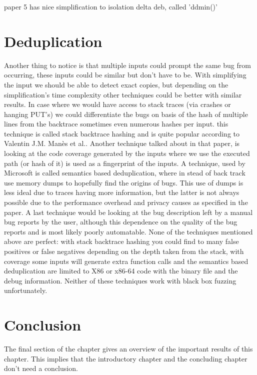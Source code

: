  paper 5 has nice simplification to isolation delta deb, called 'ddmin()'

\section{Deduplication}
Another thing to notice is that multiple inputs could prompt the same bug from occurring, these inputs could be similar but don't have to be. With simplifying the input we should be able to detect exact copies, but depending on the simplification's time complexity other techniques could be better with similar results. In case where we would have access to stack traces (via crashes or hanging PUT's) we could differentiate the bugs on basis of the hash of multiple lines from the backtrace sometimes even numerous hashes per input. this technique is called stack backtrace hashing and is quite popular according to Valentin J.M. Man\`es et al.\cite{13manes2019survey}. Another technique talked about in that paper, is looking at the code coverage generated by the inputs where we use the executed path (or hash of it) is used as a fingerprint of the inputs. A technique, used by Microsoft\cite{36semanticsAwareDeduplicationRETracer} is called semantics based deduplication, where in stead of back track use memory dumps to hopefully find the origins of bugs. This use of dumps is less ideal due to traces having more information, but the latter is not always possible due to the performance overhead and privacy causes as specified in the paper. A last technique would be looking at the bug description left by a manual bug reports by the user, although this dependence on the quality of the bug reports and is most likely poorly automatable. None of the techniques mentioned above are perfect: with stack backtrace hashing you could find to many false positives or false negatives depending on the depth taken from the stack, with coverage some inputs will generate extra function calls and the semantics based deduplication are limited to X86 or x86-64 code with the binary file and the debug information. Neither of these techniques work with black box fuzzing unfortunately.

\section{Conclusion}
The final section of the chapter gives an overview of the important results
of this chapter. This implies that the introductory chapter and the
concluding chapter don't need a conclusion.


